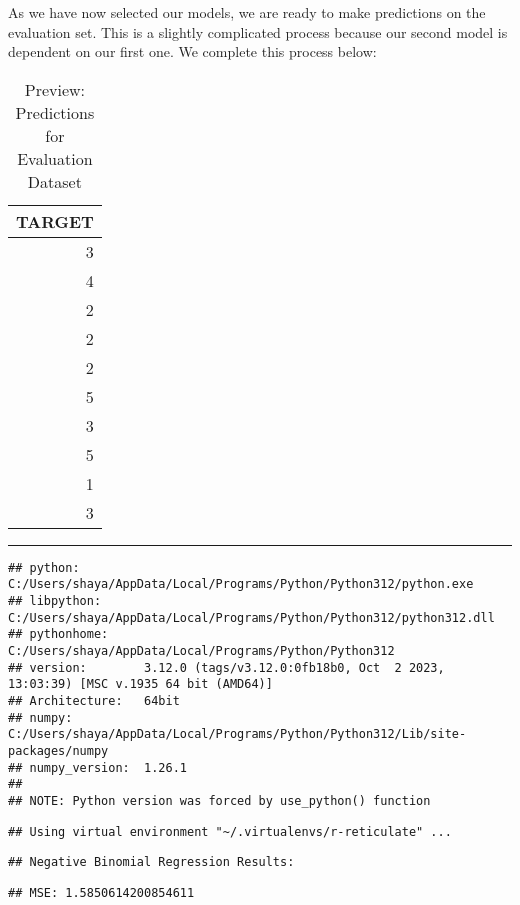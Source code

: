 \documentclass[
]{article}
\begin{document}
As we have now selected our models, we are ready to make predictions on
the evaluation set. This is a slightly complicated process because our
second model is dependent on our first one. We complete this process
below:

\begin{table}[H]
\centering\centering
\caption{\label{tab:unnamed-chunk-33}Preview: Predictions for Evaluation Dataset}
\centering
\begin{tabular}[t]{r}
\hline
TARGET\\
\hline
3\\
\hline
4\\
\hline
2\\
\hline
2\\
\hline
2\\
\hline
5\\
\hline
3\\
\hline
5\\
\hline
1\\
\hline
3\\
\hline
\end{tabular}
\end{table}

\begin{center}\rule{0.5\linewidth}{0.5pt}\end{center}

\begin{verbatim}
## python:         C:/Users/shaya/AppData/Local/Programs/Python/Python312/python.exe
## libpython:      C:/Users/shaya/AppData/Local/Programs/Python/Python312/python312.dll
## pythonhome:     C:/Users/shaya/AppData/Local/Programs/Python/Python312
## version:        3.12.0 (tags/v3.12.0:0fb18b0, Oct  2 2023, 13:03:39) [MSC v.1935 64 bit (AMD64)]
## Architecture:   64bit
## numpy:          C:/Users/shaya/AppData/Local/Programs/Python/Python312/Lib/site-packages/numpy
## numpy_version:  1.26.1
## 
## NOTE: Python version was forced by use_python() function
\end{verbatim}

\begin{verbatim}
## Using virtual environment "~/.virtualenvs/r-reticulate" ...
\end{verbatim}

\begin{verbatim}
## Negative Binomial Regression Results:
\end{verbatim}

\begin{verbatim}
## MSE: 1.5850614200854611
\end{verbatim}
\end{document}

